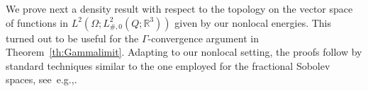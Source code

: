 \documentclass[reqno,11pt]{amsart}
\numberwithin{equation}{section}
\theoremstyle{thmlemcorr}
\numberwithin{theorem}{section}
\theoremstyle{thmlemcorr*}
\theoremstyle{defi}
\theoremstyle{remexample}
\theoremstyle{ass}
\newcommand{\R}{\mathbb{R}}
\newcommand{\1}{\mathds{1}}
\newcommand{\Om}{\Omega}
\begin{document}
We prove next a density result with respect to the topology on the vector space of functions in \( L^2(\Om;L^2_{\#,0}(Q;\R^3))\) given by our nonlocal energies. %
This turned out to be useful for the \(\Gamma\)-convergence argument in Theorem~\ref{th:Gammalimit}. Adapting to our nonlocal setting, the proofs follow by standard techniques similar to the one employed for the fractional Sobolev spaces, see~e.g.,\cite[Theorem~6.6 and Theorem~6.62]{Leo23}. %
\end{document}
